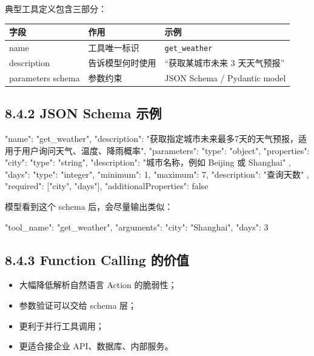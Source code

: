 典型工具定义包含三部分：


\begingroup
\scriptsize
\setlength{\tabcolsep}{3pt}
\begin{longtable}{|p{}|p{}|p{}|}
\hline
字段 & 作用 & 示例 \\ \hline
name & 工具唯一标识 & \texttt{get\_weather} \\ \hline
description & 告诉模型何时使用 & ``获取某城市未来 3 天天气预报'' \\ \hline
parameters schema & 参数约束 & JSON Schema / Pydantic model \\ \hline
\end{longtable}
\endgroup

\subsection{8.4.2 JSON Schema 示例}

\begin{codeblock}
{
  "name": "get_weather",
  "description": "获取指定城市未来最多7天的天气预报，适用于用户询问天气、温度、降雨概率",
  "parameters": {
    "type": "object",
    "properties": {
      "city": {
        "type": "string",
        "description": "城市名称，例如 Beijing 或 Shanghai"
      },
      "days": {
        "type": "integer",
        "minimum": 1,
        "maximum": 7,
        "description": "查询天数"
      }
    },
    "required": ["city", "days"],
    "additionalProperties": false
  }
}
\end{codeblock}

模型看到这个 schema 后，会尽量输出类似：


\begin{codeblock}
{
  "tool_name": "get_weather",
  "arguments": {
    "city": "Shanghai",
    "days": 3
  }
}
\end{codeblock}

\subsection{8.4.3 Function Calling 的价值}

\begin{itemize}[leftmargin=2em]
\item 大幅降低解析自然语言 Action 的脆弱性；
\item 参数验证可以交给 schema 层；
\item 更利于并行工具调用；
\item 更适合接企业 API、数据库、内部服务。
\end{itemize}

